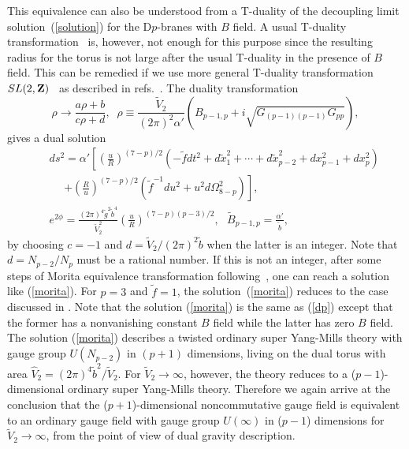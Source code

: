 \documentclass[a4paper,12pt]{article}
\begin{document}
This equivalence can also be understood from a T-duality of the decoupling
limit solution~(\ref{solution}) for the D$p$-branes with $B$ field.
A usual T-duality transformation~\cite{BHO} is, however, not enough for this
purpose since the resulting radius for the torus is not large after the usual
T-duality in the presence of $B$ field. This can be remedied if we use more
general T-duality transformation $SL(2,{\bf Z})$~\cite{GPR} as described
in refs.~\cite{Douglas,Hashimoto2}. The duality transformation
\begin{equation}
\rho \to \frac{a\rho+b}{c\rho+d}, \;\;
\rho \equiv \frac{{\tilde V}_2}{(2\pi)^2 \alpha'}\left( B_{p-1,p}
 +i \sqrt{G_{(p-1)(p-1)}G_{pp}}\right),
\end{equation}
gives a dual solution
\begin{eqnarray}
&& ds^2 = \alpha' \left[ \left(\frac{u}{R}\right)^{(7-p)/2}
 \left( -\tilde{f} dt^2 + d\tilde{x}_1^2 +\cdots +d\tilde{x}^2_{p-2}+
 dx_{p-1}^2  +dx_p^2 \right) \right. \nonumber \\
 &&~~~~~~ \left.
 +\left(\frac{R}{u}\right)^{(7-p)/2}\left({\tilde f}^{-1}
 du^2 +u^2 d\Omega_{8-p}^2 \right) \right], \nonumber \\
\label{morita}
&& e^{2\phi} = \frac{(2\pi)^4\tilde{g}^2 \tilde{b}^4}{\tilde{V}_2^2}
     \left(\frac{u}{R}\right)^{(7-p)(p-3)/2}, \ \ \ \tilde{B}_{p-1,p}=
    \frac{\alpha'}{\tilde{b}},
\end{eqnarray}
by choosing $c=-1$ and $d=\tilde{V}_2/(2\pi)^2 \tilde{b}$ when the latter is
an integer. Note that $d=N_{p-2}/N_p$ must be a rational number. If this is
not an integer, after some steps of Morita equivalence transformation
following~\cite{Hashimoto2}, one can reach a solution like (\ref{morita}).
For $p=3$ and $\tilde{f}=1$, the solution~(\ref{morita}) reduces to the case
discussed in \cite{Douglas,Hashimoto2}. Note that the solution (\ref{morita})
is the same as (\ref{dp}) except that the former has a nonvanishing constant
$B$ field while the latter has zero $B$ field. The solution (\ref{morita})
describes a twisted ordinary super Yang-Mills theory with gauge group
$U(N_{p-2})$ in $(p+1)$ dimensions, living on the dual torus with area
$\hat{V}_2 = (2\pi)^4\tilde{b}^2/\tilde{V}_2$. For $\tilde{V}_2 \to \infty$,
however, the theory reduces to a ($p-1$)-dimensional ordinary super Yang-Mills
theory. Therefore we again arrive at the conclusion that the
($p+1$)-dimensional noncommutative gauge field is equivalent to an ordinary
gauge field with gauge group $U(\infty)$ in ($p-1$) dimensions for
$\tilde{V}_2 \to \infty$, from the point of view of dual gravity description.
\end{document}
